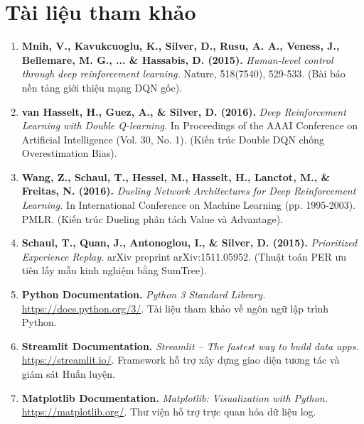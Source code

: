 \section{Tài liệu tham khảo}
\sloppy

\begin{enumerate}
    \item \textbf{Mnih, V., Kavukcuoglu, K., Silver, D., Rusu, A. A., Veness, J., Bellemare, M. G., ... \& Hassabis, D. (2015).} \textit{Human-level control through deep reinforcement learning.} Nature, 518(7540), 529-533. (Bài báo nền tảng giới thiệu mạng DQN gốc).

    \item \textbf{van Hasselt, H., Guez, A., \& Silver, D. (2016).} \textit{Deep Reinforcement Learning with Double Q-learning.} In Proceedings of the AAAI Conference on Artificial Intelligence (Vol. 30, No. 1). (Kiến trúc Double DQN chống Overestimation Bias).

    \item \textbf{Wang, Z., Schaul, T., Hessel, M., Hasselt, H., Lanctot, M., \& Freitas, N. (2016).} \textit{Dueling Network Architectures for Deep Reinforcement Learning.} In International Conference on Machine Learning (pp. 1995-2003). PMLR. (Kiến trúc Dueling phân tách Value và Advantage).

    \item \textbf{Schaul, T., Quan, J., Antonoglou, I., \& Silver, D. (2015).} \textit{Prioritized Experience Replay.} arXiv preprint arXiv:1511.05952. (Thuật toán PER ưu tiên lấy mẫu kinh nghiệm bằng SumTree).

    \item \textbf{Python Documentation.} \textit{Python 3 Standard Library.} \url{https://docs.python.org/3/}. Tài liệu tham khảo về ngôn ngữ lập trình Python.

    \item \textbf{Streamlit Documentation.} \textit{Streamlit -- The fastest way to build data apps.} \url{https://streamlit.io/}. Framework hỗ trợ xây dựng giao diện tương tác và giám sát Huấn luyện.

    \item \textbf{Matplotlib Documentation.} \textit{Matplotlib: Visualization with Python.} \url{https://matplotlib.org/}. Thư viện hỗ trợ trực quan hóa dữ liệu log.
\end{enumerate}
